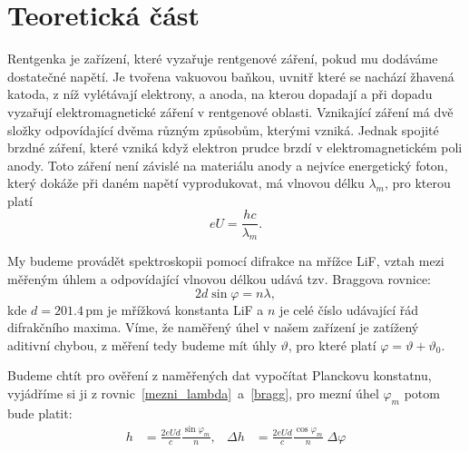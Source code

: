 \documentclass[10pt,a4paper]{article}
\renewcommand{\U}[1]{\ensuremath{\,\mathrm{#1}}}
\newcommand{\°}{\degree}
\begin{document}
\section{Teoretická část}
Rentgenka je zařízení, které vyzařuje rentgenové záření, pokud mu dodáváme dostatečné napětí. Je tvořena vakuovou baňkou, uvnitř které se nachází žhavená katoda, z níž vylétávají elektrony, a anoda, na kterou dopadají a při dopadu vyzařují elektromagnetické záření v rentgenové oblasti. Vznikající záření má dvě složky odpovídající dvěma různým způsobům, kterými vzniká. Jednak spojité brzdné záření, které vzniká když elektron prudce brzdí v elektromagnetickém poli anody. Toto záření není závislé na materiálu anody a nejvíce energetický foton, který dokáže při daném napětí vyprodukovat, má vlnovou délku $\lambda_m$, pro kterou platí
\begin{equation}
    eU = \frac{hc}{\lambda_m}.
    \label{mezni_lambda}
\end{equation}

My budeme provádět spektroskopii pomocí difrakce na mřížce LiF, vztah mezi měřeným úhlem a odpovídající vlnovou délkou udává tzv. Braggova rovnice:
\begin{equation}
    2d \sin \varphi = n\lambda,
    \label{bragg}
\end{equation}
kde $d=201.4 \U{pm}$ je mřížková konstanta LiF a $n$ je celé číslo udávající řád difrakčního maxima. Víme, že naměřený úhel v našem zařízení je zatížený aditivní chybou, z měření tedy budeme mít úhly $\vartheta$, pro které platí $\varphi = \vartheta + \vartheta_0$.

Budeme chtít pro ověření z naměřených dat vypočítat Planckovu konstatnu, vyjádříme si ji z rovnic~\eqref{mezni_lambda}~a~\eqref{bragg}, pro mezní úhel $\varphi_m$ potom bude platit:
\begin{align}
    h &= \frac{2eUd}{c} \frac{\sin \varphi_m}{n}, &
    \Delta h &= \frac{2eUd}{c} \frac{\cos \varphi_m}{n} \; \Delta\varphi
    \label{planck}
\end{align}
\end{document}
